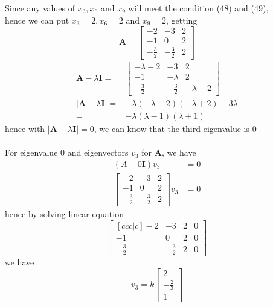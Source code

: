 \documentclass[12pt]{article}
\newcommand{\matr}[1]{\mathbf{#1}}
\begin{document}
Since any values of $x_3,x_6$ and $x_9$ will meet the condition (48) and (49), \\
hence we can put $x_3=2, x_6=2$ and $x_9=2$, getting
\begin{equation}
	\matr A = \left[\begin{matrix}-2 & -3 & 2\\-1 & 0 & 2\\- \frac{3}{2} & - \frac{3}{2} & 2\end{matrix}\right]
\end{equation}
\begin{align}
	\matr A-\lambda \matr I  = & \left[\begin{matrix}- \lambda - 2 & -3 & 2 \\-1 & - \lambda & 2\\- \frac{3}{2} & - \frac{3}{2} & - \lambda + 2\end{matrix}\right] \\
	|\matr A - \lambda \matr I|=& - \lambda \left(- \lambda - 2\right) \left(- \lambda + 2\right) - 3 \lambda \\
	=&-\lambda(\lambda-1)(\lambda+1)
\end{align}
hence with $|\matr A - \lambda \matr I|=0$, we can know that the third eigenvalue is $0$ \\ \\
For eigenvalue $0$ and eigenvectors $v_3$ for $\matr A$, we have
\begin{align}
	\left(A-0\matr I \right) v_3 &= 0 \\
	\left[\begin{matrix}-2 & -3 & 2 \\-1 & 0 & 2\\- \frac{3}{2} & - \frac{3}{2} & 2\end{matrix}\right] v_3 &= 0 
\end{align}
hence by solving linear equation
\begin{equation}
	\begin{bmatrix}[ccc|c]
		-2 & -3 & 2 & 0 \\-1 & 0 & 2 & 0\\- \frac{3}{2} & - \frac{3}{2} & 2 & 0
	\end{bmatrix}
\end{equation}
we have 
\begin{equation}
	v_3 = k \begin{bmatrix}
	2 \\ -\frac 2 3 \\ 1
	\end{bmatrix}
\end{equation}
\end{document}
